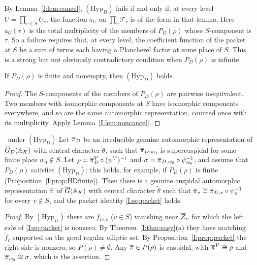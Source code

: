 By Lemma~\ref{I:lem:cancel}, $(\mathrm{Hyp}_D)$ fails if and only if, at every level $U=\prod_{v\in S}U_v$, the function $a_U$ on $\prod_v\mathcal T_v$ is of the form in that lemma. Here $a_U(\tau)$ is the total multiplicity of the members of $P_D(\rho)$ whose $S$-component is $\tau$. So a failure requires that, at every level, the coefficient function of the packet at $S$ be a sum of terms each having a Plancherel factor at some place of $S$. This is a strong but not obviously contradictory condition when $P_D(\rho)$ is infinite.

\begin{proposition}\label{I:prop:HDfinite}
If $P_D(\rho)$ is finite and nonempty, then $(\mathrm{Hyp}_D)$ holds.
\end{proposition}
\begin{proof}
The $S$-components of the members of $P_D(\rho)$ are pairwise inequivalent. Two members with isomorphic components at $S$ have isomorphic components everywhere, and so are the same automorphic representation, counted once with its multiplicity. Apply Lemma~\ref{I:lem:noncancel}.
\end{proof}

\begin{theorem}[Theorem C]\label{I:thm:transfer}\ under $(\mathrm{Hyp}_D)$
Let $\overline{\pi}_D$ be an irreducible genuine automorphic representation of $\overline{G}_D(\mathbb{A}_K)$ with central character $\tilde\theta$, such that $\overline{\pi}_{D,w_0}$ is supercuspidal for some finite place $w_0\notin S$. Let $\rho=\overline{\pi}_D^V\circ(\psi^V)^{-1}$ and $\sigma=\overline{\pi}_{D,w_0}\circ\psi_{w_0}^{-1}$, and assume that $P_D(\rho)$ satisfies $(\mathrm{Hyp}_D)$; this holds, for example, if $P_D(\rho)$ is finite (Proposition~\ref{I:prop:HDfinite}). Then there is a genuine cuspidal automorphic representation $\overline{\pi}$ of $\overline{G}(\mathbb{A}_K)$ with central character $\tilde\theta$ such that $\overline{\pi}_v\cong\overline{\pi}_{D,v}\circ\psi_v^{-1}$ for every $v\notin S$, and the packet identity \eqref{I:eq:packet} holds.
\end{theorem}

\begin{proof}
By $(\mathrm{Hyp}_D)$ there are $\tilde f_{D,v}$ ($v\in S$) vanishing near $\overline{Z}_v$ for which the left side of \eqref{I:eq:packet} is nonzero. By Theorem~\ref{I:thm:easy}(a) they have matching $\tilde f_v$ supported on the good regular elliptic set. By Proposition~\ref{I:prop:packet} the right side is nonzero, so $P(\rho)\ne\emptyset$. Any $\overline{\pi}\in P(\rho)$ is cuspidal, with $\overline{\pi}^V\cong\rho$ and $\overline{\pi}_{w_0}\cong\sigma$, which is the assertion.
\end{proof}

